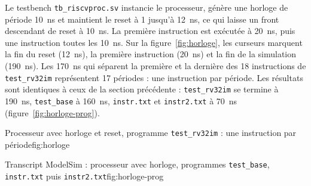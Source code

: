 Le testbench \texttt{tb\_riscvproc.sv} instancie le processeur, génère une horloge de période
10~ns et maintient le reset à 1 jusqu'à 12~ns, ce qui laisse un front descendant de reset à
10~ns. La première instruction est exécutée à 20~ns, puis une instruction toutes les 10~ns.
Sur la figure~\ref{fig:horloge}, les curseurs marquent la fin du reset (12~ns), la première
instruction (20~ns) et la fin de la simulation (190~ns). Les 170~ns qui séparent la première
et la dernière des 18 instructions de \texttt{test\_rv32im} représentent 17 périodes : une
instruction par période. Les résultats sont identiques à ceux de la section précédente :
\texttt{test\_rv32im} se termine à 190~ns, \texttt{test\_base} à 160~ns, \texttt{instr.txt} et
\texttt{instr2.txt} à 70~ns (figure~\ref{fig:horloge-prog}).

{Processeur avec horloge et reset, programme \texttt{test\_rv32im} : une instruction par
période}{fig:horloge}

{Transcript ModelSim : processeur avec horloge, programmes \texttt{test\_base},
\texttt{instr.txt} puis \texttt{instr2.txt}}{fig:horloge-prog}
